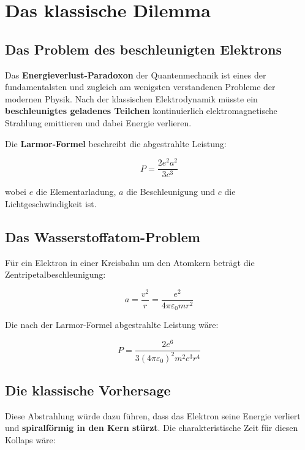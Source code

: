 \documentclass[12pt,a4paper]{report}
\begin{document}
\section{Das klassische Dilemma}

\subsection{Das Problem des beschleunigten Elektrons}

Das \textbf{Energieverlust-Paradoxon} der Quantenmechanik ist eines der fundamentalsten und zugleich am wenigsten verstandenen Probleme der modernen Physik. Nach der klassischen Elektrodynamik müsste ein \textbf{beschleunigtes geladenes Teilchen} kontinuierlich elektromagnetische Strahlung emittieren und dabei Energie verlieren.

Die \textbf{Larmor-Formel} beschreibt die abgestrahlte Leistung:

\begin{equation}
	P = \frac{2e^2a^2}{3c^3}
\end{equation}

wobei $e$ die Elementarladung, $a$ die Beschleunigung und $c$ die Lichtgeschwindigkeit ist.

\subsection{Das Wasserstoffatom-Problem}

Für ein Elektron in einer Kreisbahn um den Atomkern beträgt die Zentripetalbeschleunigung:

\begin{equation}
	a = \frac{v^2}{r} = \frac{e^2}{4\pi\varepsilon_0 mr^2}
\end{equation}

Die nach der Larmor-Formel abgestrahlte Leistung wäre:

\begin{equation}
	P = \frac{2e^6}{3(4\pi\varepsilon_0)^2 m^2 c^3 r^4}
\end{equation}

\subsection{Die klassische Vorhersage}

Diese Abstrahlung würde dazu führen, dass das Elektron seine Energie verliert und \textbf{spiralförmig in den Kern stürzt}. Die charakteristische Zeit für diesen Kollaps wäre:
\end{document}
